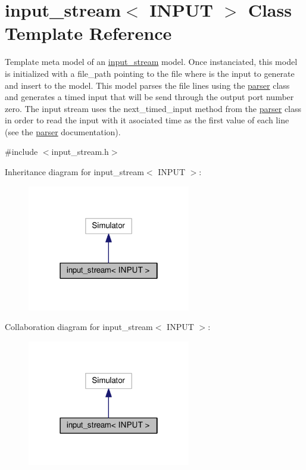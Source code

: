 \hypertarget{classinput__stream}{}\section{input\+\_\+stream$<$ I\+N\+P\+UT $>$ Class Template Reference}
\label{classinput__stream}


Template meta model of an \hyperlink{classinput__stream}{input\+\_\+stream} model. Once instanciated, this model is initialized with a file\+\_\+path pointing to the file where is the input to generate and insert to the model. This model parses the file lines using the \hyperlink{classParser}{parser} class and generates a timed input that will be send through the output port number zero. The input stream uses the next\+\_\+timed\+\_\+input method from the \hyperlink{classParser}{parser} class in order to read the input with it asociated time as the first value of each line (see the \hyperlink{classParser}{parser} documentation).  




{\ttfamily \#include $<$input\+\_\+stream.\+h$>$}



Inheritance diagram for input\+\_\+stream$<$ I\+N\+P\+UT $>$\+:\nopagebreak
\begin{figure}[H]
\begin{center}
\leavevmode
\includegraphics[width=202pt]{classinput__stream__inherit__graph}
\end{center}
\end{figure}


Collaboration diagram for input\+\_\+stream$<$ I\+N\+P\+UT $>$\+:\nopagebreak
\begin{figure}[H]
\begin{center}
\leavevmode
\includegraphics[width=202pt]{classinput__stream__coll__graph}
\end{center}
\end{figure}
